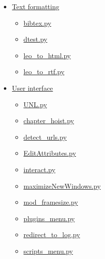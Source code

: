 \documentclass[a4paper,10pt,english]{sphinxmanual}
\begin{document}
{\begin{minipage}{0.95\linewidth}
\begin{itemize}
\begin{itemize}
\begin{itemize}
\begin{itemize}
\item {} 
{\hyperref[plugins:slideshow-py]{slideshow.py}}

\end{itemize}

\item {} 
{\hyperref[plugins:text-formatting]{Text formatting}}
\begin{itemize}
\item {} 
{\hyperref[plugins:bibtex-py]{bibtex.py}}

\item {} 
{\hyperref[plugins:dtest-py]{dtest.py}}

\item {} 
{\hyperref[plugins:leo-to-html-py]{leo\_to\_html.py}}

\item {} 
{\hyperref[plugins:leo-to-rtf-py]{leo\_to\_rtf.py}}

\end{itemize}

\item {} 
{\hyperref[plugins:user-interface]{User interface}}
\begin{itemize}
\item {} 
{\hyperref[plugins:unl-py]{UNL.py}}

\item {} 
{\hyperref[plugins:chapter-hoist-py]{chapter\_hoist.py}}

\item {} 
{\hyperref[plugins:detect-urls-py]{detect\_urls.py}}

\item {} 
{\hyperref[plugins:editattributes-py]{EditAttributes.py}}

\item {} 
{\hyperref[plugins:interact-py]{interact.py}}

\item {} 
{\hyperref[plugins:maximizenewwindows-py]{maximizeNewWindows.py}}

\item {} 
{\hyperref[plugins:mod-framesize-py]{mod\_framesize.py}}

\item {} 
{\hyperref[plugins:plugins-menu-py]{plugins\_menu.py}}

\item {} 
{\hyperref[plugins:redirect-to-log-py]{redirect\_to\_log.py}}

\item {} 
{\hyperref[plugins:scripts-menu-py]{scripts\_menu.py}}


\end{itemize}
\end{itemize}
\end{itemize}
\end{itemize}
\end{minipage}}
\end{document}
